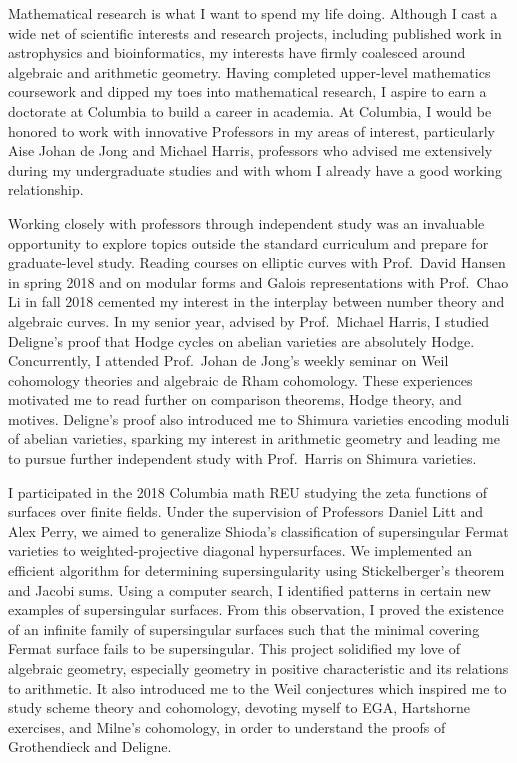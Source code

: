 \documentclass[11pt]{article}
\begin{document}
Mathematical research is what I want to spend my life doing. Although I cast a wide net of scientific interests and research projects, including published work in astrophysics and bioinformatics, my interests have firmly coalesced around algebraic and arithmetic geometry. Having completed upper-level mathematics coursework and dipped my toes into mathematical research, I aspire to earn a doctorate at Columbia to build a career in academia. At Columbia, I would be honored to work with innovative Professors in my areas of interest, particularly Aise Johan de Jong and Michael Harris, professors who advised me extensively during my undergraduate studies and with whom I already have a good working relationship.
\par
Working closely with professors through independent study was an invaluable opportunity to explore topics outside the standard curriculum and prepare for graduate-level study. Reading courses on elliptic curves with Prof.\ David Hansen in spring 2018 and on modular forms and Galois representations with Prof.\ Chao Li in fall 2018 cemented my interest in the interplay between number theory and algebraic curves. In my senior year, advised by Prof.\ Michael Harris, I studied Deligne's proof that Hodge cycles on abelian varieties are absolutely Hodge. Concurrently, I attended Prof.\ Johan de Jong's weekly seminar on Weil cohomology theories and algebraic de Rham cohomology. These experiences motivated me to read further on comparison theorems, Hodge theory, and motives. Deligne's proof also introduced me to Shimura varieties encoding moduli of abelian varieties, sparking my interest in arithmetic geometry and leading me to pursue further independent study with Prof.\ Harris on Shimura varieties.
\par
I participated in the 2018 Columbia math REU studying the zeta functions of surfaces over finite fields. Under the supervision of Professors Daniel Litt and Alex Perry, we aimed to generalize Shioda’s classification of supersingular Fermat varieties  to weighted-projective diagonal hypersurfaces. We implemented an efficient algorithm for determining supersingularity using Stickelberger's theorem and Jacobi sums. Using a computer search, I identified patterns in certain new examples of supersingular surfaces. From this observation, I proved the existence of an infinite family of supersingular surfaces such that the minimal covering Fermat surface fails to be supersingular. This project solidified my love of algebraic geometry, especially geometry in positive characteristic and its relations to arithmetic. It also introduced me to the Weil conjectures which inspired me to study scheme theory and \etale cohomology, devoting myself to EGA, Hartshorne exercises, and Milne's \etale cohomology, in order to understand the proofs of Grothendieck and Deligne. 
\end{document}
